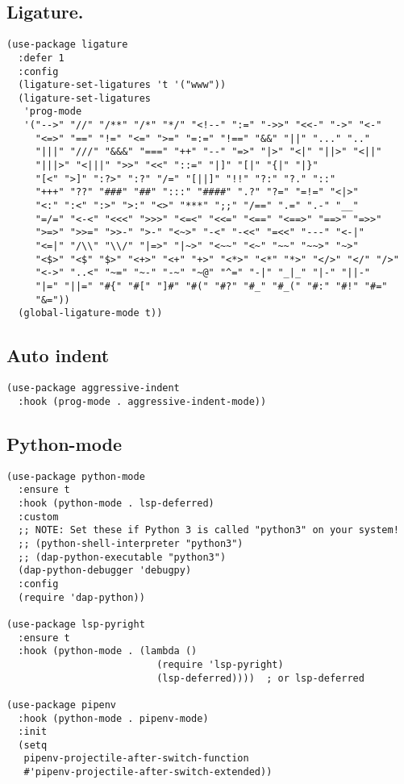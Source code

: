 \documentclass[11pt]{article}
\begin{document}
\subsection{Ligature.}
\label{sec:orgb140187}
\begin{verbatim}
(use-package ligature
  :defer 1
  :config
  (ligature-set-ligatures 't '("www"))
  (ligature-set-ligatures
   'prog-mode
   '("-->" "//" "/**" "/*" "*/" "<!--" ":=" "->>" "<<-" "->" "<-"
     "<=>" "==" "!=" "<=" ">=" "=:=" "!==" "&&" "||" "..." ".."
     "|||" "///" "&&&" "===" "++" "--" "=>" "|>" "<|" "||>" "<||"
     "|||>" "<|||" ">>" "<<" "::=" "|]" "[|" "{|" "|}"
     "[<" ">]" ":?>" ":?" "/=" "[||]" "!!" "?:" "?." "::"
     "+++" "??" "###" "##" ":::" "####" ".?" "?=" "=!=" "<|>"
     "<:" ":<" ":>" ">:" "<>" "***" ";;" "/==" ".=" ".-" "__"
     "=/=" "<-<" "<<<" ">>>" "<=<" "<<=" "<==" "<==>" "==>" "=>>"
     ">=>" ">>=" ">>-" ">-" "<~>" "-<" "-<<" "=<<" "---" "<-|"
     "<=|" "/\\" "\\/" "|=>" "|~>" "<~~" "<~" "~~" "~~>" "~>"
     "<$>" "<$" "$>" "<+>" "<+" "+>" "<*>" "<*" "*>" "</>" "</" "/>"
     "<->" "..<" "~=" "~-" "-~" "~@" "^=" "-|" "_|_" "|-" "||-"
     "|=" "||=" "#{" "#[" "]#" "#(" "#?" "#_" "#_(" "#:" "#!" "#="
     "&="))
  (global-ligature-mode t))
\end{verbatim}
\subsection{Auto indent}
\label{sec:orgbd6a025}
\begin{verbatim}
(use-package aggressive-indent
  :hook (prog-mode . aggressive-indent-mode))
\end{verbatim}
\subsection{Python-mode}
\label{sec:org52a3d66}
\begin{verbatim}
(use-package python-mode
  :ensure t
  :hook (python-mode . lsp-deferred)
  :custom
  ;; NOTE: Set these if Python 3 is called "python3" on your system!
  ;; (python-shell-interpreter "python3")
  ;; (dap-python-executable "python3")
  (dap-python-debugger 'debugpy)
  :config
  (require 'dap-python))

(use-package lsp-pyright
  :ensure t
  :hook (python-mode . (lambda ()
                          (require 'lsp-pyright)
                          (lsp-deferred))))  ; or lsp-deferred

(use-package pipenv
  :hook (python-mode . pipenv-mode)
  :init
  (setq
   pipenv-projectile-after-switch-function
   #'pipenv-projectile-after-switch-extended))
\end{verbatim}
\end{document}
